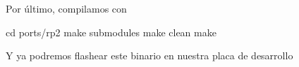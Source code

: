 \newpage
Por último, compilamos con 
\begin{multicli}
  \cliarrow cd ports/rp2 \newline
  \cliarrow make submodules \newline
  \cliarrow make clean \newline
  \cliarrow make
\end{multicli}

Y ya podremos flashear este binario en nuestra placa de desarrollo
